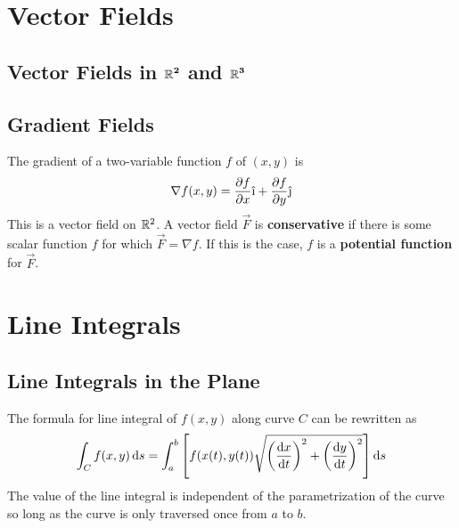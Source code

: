 \documentclass[./Calculus \Roman{3}.tex]{subfiles}
\begin{document}
	\section{Vector Fields}
		\subsection*{Vector Fields in $\bm{\mathbb{R}^2}$ and $\bm{\mathbb{R}^3}$}
		\subsection*{Gradient Fields}
			The gradient of a two-variable function $f$ of $(x, y)$ is
				\[\nabla f(x, y) = \pder{f}{x}\vi + \pder{f}{y}\vj\]
				This is a vector field on $\mathbb{R}^2$.
			A vector field $\vec{F}$ is \textbf{conservative} if there is some scalar function $f$ for which $\vec{F} = \nabla f$. If this is the case, $f$ is a \textbf{potential function} for $\vec{F}$.
	\section{Line Integrals}
		\subsection*{Line Integrals in the Plane}
			The formula for line integral of $f(x, y)$ along curve $C$ can be rewritten as 
				\[\int_C f(x, y)\,\mathrm{d} s = \int_a^b\left[f(x(t), y(t))\sqrt{\left(\frac{\mathrm{d} x}{\mathrm{d} t}\right)^2 + \left(\frac{\mathrm{d} y}{\mathrm{d} t}\right)^2}\right]\mathrm{d} s\]
			The value of the line integral is independent of the parametrization of the curve so long as the curve is only traversed once from $a$ to $b$.
\end{document}
